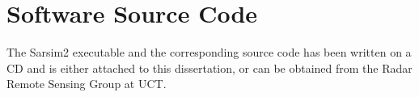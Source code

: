                       

\chapter{Software Source Code}

The Sarsim2 executable and the corresponding source code has been written on
a CD and is either attached to this dissertation, or can be obtained from
the Radar Remote Sensing Group at UCT.
